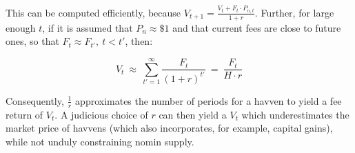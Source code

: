 \noindent This can be computed efficiently, because \(V_{t+1} = \frac{V_t + F_t \cdot P_{n,t}}{1 + r}\). 
Further, for large enough \(t\), if it is assumed that \(P_n \approx \$1\) and that current fees are close to
future ones, so that \(F_t \approx F_{t'}, \ t < t'\), then:

\vspace{2mm}

\begin{equation} 
    V_t \ \approx \ \sum_{t'=1}^{\infty} \frac{F_t}{{(1 + r)}^{t'}} \ = \ \frac{F_t}{H \cdot r} \label{eq:havvenvalue}
\end{equation}

\vspace{3mm}

\noindent Consequently, \(\frac{1}{r}\) approximates the number of periods for
a havven to yield a fee return of \(V_t\). A judicious choice of \(r\) can then
yield a \(V_t\) which underestimates the market price of havvens (which also
incorporates, for example, capital gains), while not unduly constraining
nomin supply.

